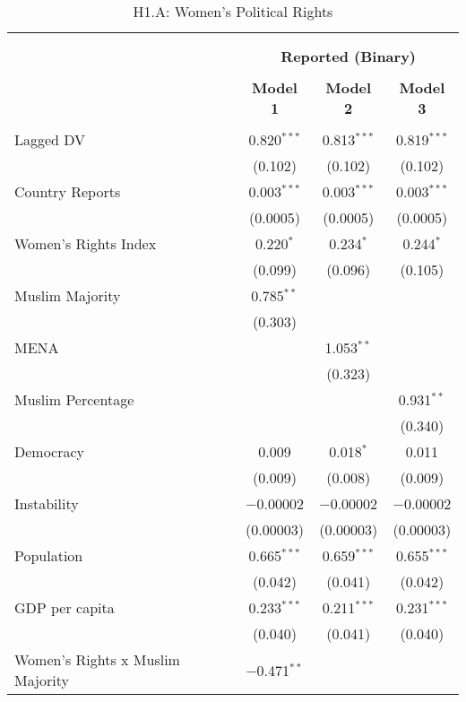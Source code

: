 
\begin{table}[!htbp] \centering 
  \caption{H1.A: Women's Political Rights} 
  \label{} 
\begin{tabular}{@{\extracolsep{5pt}}lccc} 
\\[-1.8ex]\hline \\[-1.8ex] 
\\[-1.8ex] & \multicolumn{3}{c}{\textbf{Reported (Binary)}} \\ 
\\[-1.8ex] & \textbf{Model 1} & \textbf{Model 2} & \textbf{Model 3}\\ 
\hline \\[-1.8ex] 
 Lagged DV & 0.820$^{***}$ & 0.813$^{***}$ & 0.819$^{***}$ \\ 
  & (0.102) & (0.102) & (0.102) \\ 
  Country Reports & 0.003$^{***}$ & 0.003$^{***}$ & 0.003$^{***}$ \\ 
  & (0.0005) & (0.0005) & (0.0005) \\ 
  Women's Rights Index & 0.220$^{*}$ & 0.234$^{*}$ & 0.244$^{*}$ \\ 
  & (0.099) & (0.096) & (0.105) \\ 
  Muslim Majority & 0.785$^{**}$ &  &  \\ 
  & (0.303) &  &  \\ 
  MENA &  & 1.053$^{**}$ &  \\ 
  &  & (0.323) &  \\ 
  Muslim Percentage &  &  & 0.931$^{**}$ \\ 
  &  &  & (0.340) \\ 
  Democracy & 0.009 & 0.018$^{*}$ & 0.011 \\ 
  & (0.009) & (0.008) & (0.009) \\ 
  Instability & $-$0.00002 & $-$0.00002 & $-$0.00002 \\ 
  & (0.00003) & (0.00003) & (0.00003) \\ 
  Population & 0.665$^{***}$ & 0.659$^{***}$ & 0.655$^{***}$ \\ 
  & (0.042) & (0.041) & (0.042) \\ 
  GDP per capita & 0.233$^{***}$ & 0.211$^{***}$ & 0.231$^{***}$ \\ 
  & (0.040) & (0.041) & (0.040) \\ 
  Women's Rights x Muslim Majority & $-$0.471$^{**}$ &  &  \\ 

\end{tabular}
\end{table}
